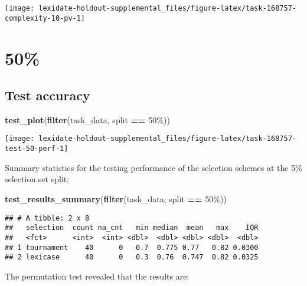 \documentclass[
]{book}
\newenvironment{Shaded}{\begin{snugshade}}{\end{snugshade}}
\newcommand{\FunctionTok}[1]{\textcolor[rgb]{0.13,0.29,0.53}{\textbf{#1}}}
\newcommand{\NormalTok}[1]{#1}
\newcommand{\SpecialCharTok}[1]{\textcolor[rgb]{0.81,0.36,0.00}{\textbf{#1}}}
\newcommand{\StringTok}[1]{\textcolor[rgb]{0.31,0.60,0.02}{#1}}
\begin{document}
\texttt{[image: lexidate-holdout-supplemental\_files/figure-latex/task-168757-complexity-10-pv-1]}

\hypertarget{section-22}{%
\section{50\%}\label{section-22}}

\hypertarget{test-accuracy-22}{%
\subsection{Test accuracy}\label{test-accuracy-22}}

\begin{Shaded}
\begin{Highlighting}[]
\FunctionTok{test\_plot}\NormalTok{(}\FunctionTok{filter}\NormalTok{(task\_data, split }\SpecialCharTok{==} \StringTok{\textquotesingle{}50\%\textquotesingle{}}\NormalTok{))}
\end{Highlighting}
\end{Shaded}

\texttt{[image: lexidate-holdout-supplemental\_files/figure-latex/task-168757-test-50-perf-1]}

Summary statistics for the testing performance of the selection schemes at the 5\% selection set split:

\begin{Shaded}
\begin{Highlighting}[]
\FunctionTok{test\_results\_summary}\NormalTok{(}\FunctionTok{filter}\NormalTok{(task\_data, split }\SpecialCharTok{==} \StringTok{\textquotesingle{}50\%\textquotesingle{}}\NormalTok{))}
\end{Highlighting}
\end{Shaded}

\begin{verbatim}
## # A tibble: 2 x 8
##   selection  count na_cnt   min median  mean   max    IQR
##   <fct>      <int>  <int> <dbl>  <dbl> <dbl> <dbl>  <dbl>
## 1 tournament    40      0   0.7  0.775 0.77   0.82 0.0300
## 2 lexicase      40      0   0.3  0.76  0.747  0.82 0.0325
\end{verbatim}

The permutation test revealed that the results are:
\end{document}
